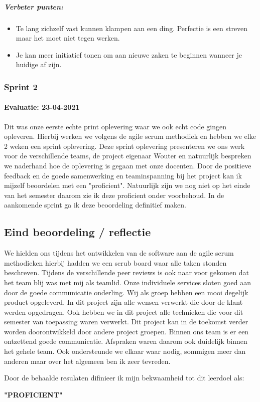	\subparagraph{Verbeter punten:}
	\begin{itemize}
		\setlength{\itemsep}{0pt}%
		\setlength{\parskip}{0pt}%
		\item Te lang zichzelf vast kunnen klampen aan een ding.
		Perfectie is een streven maar het moet niet tegen werken.
		\item Je kan meer initiatief tonen om aan nieuwe zaken te beginnen wanneer je huidige af zijn.
	\end{itemize}

	\bigskip

	\subsubsection{Sprint 2}
	\paragraph{Evaluatie: 23-04-2021}
	Dit was onze eerste echte print oplevering waar we ook echt code gingen opleveren.
	Hierbij werken we volgens de agile scrum methodiek en hebben we elke 2 weken een sprint oplevering.
	Deze sprint oplevering presenteren we ons werk voor de verschillende teams, de project eigenaar Wouter en
	natuurlijk bespreken we naderhand hoe de oplevering is gegaan met onze docenten.
	Door de positieve feedback en de goede samenwerking en teaminspanning bij het project kan ik mijzelf
	beoordelen met een "proficient".
	Natuurlijk zijn we nog niet op het einde van het semester daarom zie ik deze proficient onder voorbehoud.
	In de aankomende sprint ga ik deze beoordeling definitief maken.





\subsection{Eind beoordeling / reflectie}
We hielden ons tijdens het ontwikkelen van de software aan de agile scrum methodieken hierbij hadden we een scrub board waar alle taken stonden beschreven.
Tijdens de verschillende peer reviews is ook naar voor gekomen dat het team blij was met mij als teamlid.
Onze individuele services sloten goed aan door de goede communicatie onderling.
Wij als groep hebben een mooi degelijk product opgeleverd.
In dit project zijn alle wensen verwerkt die door de klant werden opgedragen.
Ook hebben we in dit project alle technieken die voor dit semester van toepassing waren verwerkt.
Dit project kan in de toekomst verder worden doorontwikkeld door andere project groepen.
Binnen ons team is er een ontzettend goede communicatie. Afspraken waren daarom ook duidelijk binnen het gehele team.
Ook ondersteunde we elkaar waar nodig, sommigen meer dan anderen maar over het algemeen ben ik zeer tevreden.

Door de behaalde resulaten difinieer ik mijn bekwaamheid tot dit leerdoel als:\\
\par\vspace{10pt}\textbf{\uppercase{"Proficient"}}\\

\newpage
